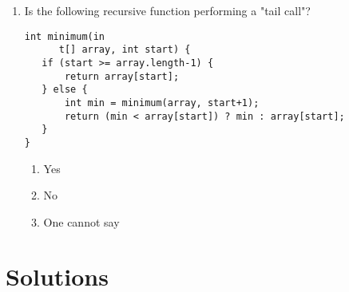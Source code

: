 \documentclass[11pt]{article}
\begin{document}
\begin{enumerate}
\item Is the following recursive function performing a "tail call"?
\begin{verbatim}
int minimum(in
      t[] array, int start) {
   if (start >= array.length-1) {
       return array[start];
   } else {
       int min = minimum(array, start+1);
       return (min < array[start]) ? min : array[start];
   }
}
\end{verbatim}
\begin{enumerate}
\item Yes
\item No
\item One cannot say
\end{enumerate}
\end{enumerate}


\section{Solutions}
\label{sec:org5dbfc67}
\end{document}
